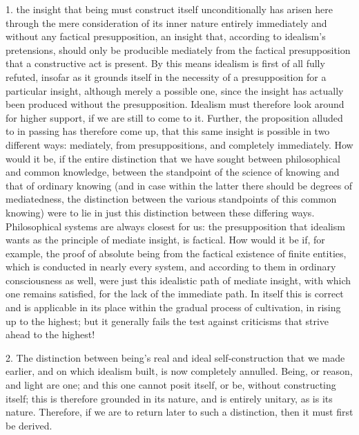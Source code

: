 1. the insight that being must construct itself
unconditionally has arisen here
through the mere consideration
of its inner nature entirely immediately
and without any factical presupposition,
an insight that, according to idealism's pretensions,
should only be producible mediately
from the factical presupposition
that a constructive act is present.
By this means idealism is
first of all fully refuted,
insofar as it grounds itself
in the necessity of a presupposition
for a particular insight,
although merely a possible one,
since the insight has actually
been produced without the presupposition.
Idealism must therefore look
around for higher support,
if we are still to come to it.
Further, the proposition alluded
to in passing has therefore come up,
that this same insight is possible
in two different ways:
mediately, from presuppositions,
and completely immediately.
How would it be,
if the entire distinction that we have sought
between philosophical and common knowledge,
between the standpoint of the science of knowing
and that of ordinary knowing
(and in case within the latter
there should be degrees of mediatedness,
the distinction between the various standpoints
of this common knowing)
were to lie in just this distinction
between these differing ways.
Philosophical systems are always closest for us:
the presupposition that idealism wants
as the principle of mediate insight, is factical.
How would it be if, for example,
the proof of absolute being
from the factical existence of finite entities,
which is conducted in nearly every system,
and according to them in ordinary consciousness as well,
were just this idealistic path of mediate insight,
with which one remains satisfied,
for the lack of the immediate path.
In itself this is correct
and is applicable in its place
within the gradual process of cultivation,
in rising up to the highest;
but it generally fails the test against criticisms
that strive ahead to the highest!

2. The distinction between being's
real and ideal self-construction
that we made earlier,
and on which idealism built,
is now completely annulled.
Being, or reason, and light are one;
and this one cannot posit itself, or be,
without constructing itself;
this is therefore grounded in its nature,
and is entirely unitary, as is its nature.
Therefore, if we are to return
later to such a distinction,
then it must first be derived.

